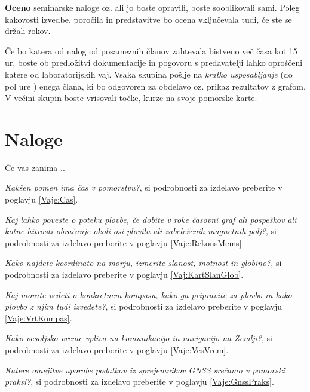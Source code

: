 \textbf{Oceno} seminarske naloge oz. ali jo boste opravili, boste sooblikovali sami. Poleg kakovosti izvedbe, poročila in predstavitve bo ocena vključevala tudi, če ste se držali rokov. 

Če bo katera od nalog od posameznih članov zahtevala bistveno več časa kot 15 ur, boste ob predložitvi dokumentacije in pogovoru s predavatelji lahko oproščeni katere od laboratorijskih vaj. Vsaka skupina pošlje na \textit{kratko usposabljanje} (do pol ure ) enega člana, ki bo odgovoren za obdelavo oz. prikaz rezultatov z grafom. V večini skupin boste vrisovali točke, kurze na svoje pomorske karte.


\section*{Naloge}
Če vas zanima ..
\begin{prob}
	\label{Nal:SplNavCas}
	 \textit{Kakšen pomen ima čas v pomorstvu?}, si podrobnosti za izdelavo preberite v poglavju \ref{Vaje:Cas}.
\end{prob}

\begin{prob}
	\label{Nal:SplNavMem}
	\textit{Kaj lahko poveste o poteku plovbe, če dobite v roke časovni graf ali pospeškov ali kotne hitrosti obračanje okoli osi plovila ali zabeleženih magnetnih polj?}, si podrobnosti za izdelavo preberite v poglavju \ref{Vaje:RekonsMems}.
\end{prob}


\begin{prob}
	\label{Nal:SplNavKart}
	\textit{Kako najdete koordinato na morju, izmerite slanost, motnost in globino?}, si podrobnosti za izdelavo preberite v poglavju \ref{Vaj:KartSlanGlob}.
\end{prob}

\begin{prob}
	\label{Nal:SplNavKomp}
	\textit{Kaj morate vedeti o konkretnem kompasu, kako ga pripravite za plovbo in kako plovbo z njim tudi izvedete?}, si podrobnosti za izdelavo preberite v poglavju \ref{Vaje:VrtKompas}.
\end{prob}

\begin{prob}
	\label{Nal:SplNavVes}
	\textit{Kako vesoljsko vreme vpliva na komunikacijo in navigacijo na Zemlji?}, si podrobnosti za izdelavo preberite v poglavju \ref{Vaje:VesVrem}.  
\end{prob}

\begin{prob}
	\label{Nal:SplNavGns}
	\textit{Katere omejitve uporabe podatkov iz sprejemnikov GNSS srečamo v pomorski praksi?}, si podrobnosti za izdelavo preberite v poglavju \ref{Vaje:GnssPraks}.
\end{prob}







%

